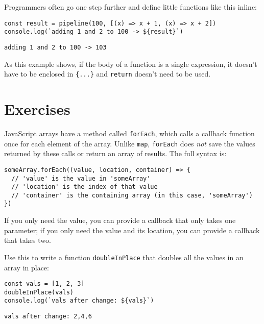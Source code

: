 Programmers often go one step further and define little functions like this inline:

\begin{verbatim}
const result = pipeline(100, [(x) => x + 1, (x) => x + 2])
console.log(`adding 1 and 2 to 100 -> ${result}`)
\end{verbatim}

\begin{verbatim}
adding 1 and 2 to 100 -> 103
\end{verbatim}

As this example shows,
if the body of a function is a single expression,
it doesn't have to be enclosed in \texttt{\{...\}} and \texttt{return} doesn't need to be used.

\section{Exercises}\label{s:callbacks-exercises}


JavaScript arrays have a method called \texttt{forEach},
which calls a callback function once for each element of the array.
Unlike \texttt{map},
\texttt{forEach} does \emph{not} save the values returned by these calls
or return an array of results.
The full syntax is:

\begin{verbatim}
someArray.forEach((value, location, container) => {
  // 'value' is the value in 'someArray'
  // 'location' is the index of that value
  // 'container' is the containing array (in this case, 'someArray')
})
\end{verbatim}

If you only need the value,
you can provide a callback that only takes one parameter;
if you only need the value and its location,
you can provide a callback that takes two.

Use this to write a function \texttt{doubleInPlace}
that doubles all the values in an array in place:

\begin{verbatim}
const vals = [1, 2, 3]
doubleInPlace(vals)
console.log(`vals after change: ${vals}`)
\end{verbatim}

\begin{verbatim}
vals after change: 2,4,6
\end{verbatim}


